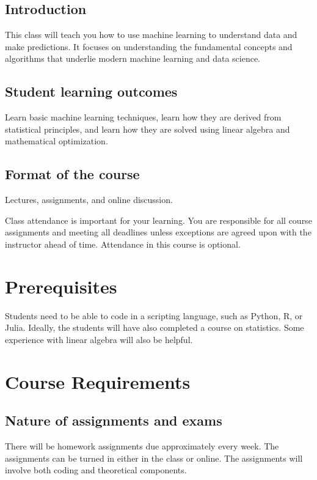 \documentclass[11pt]{article}
\begin{document}
\subsection{Introduction}
This class will teach you how to use machine learning to understand data and make predictions. It focuses on understanding the fundamental concepts and algorithms that underlie modern machine learning and data science.

\subsection{Student learning outcomes}
Learn basic machine learning techniques, learn how they are derived from statistical principles, and learn how they are solved using linear algebra and mathematical optimization.

\subsection{Format of the course}
Lectures, assignments, and online discussion.

Class attendance is important for your learning. You are responsible for all course
assignments and meeting all deadlines unless exceptions are agreed upon with the
instructor ahead of time. Attendance in this course is optional.

\section{Prerequisites}

Students need to be able to code in a scripting language, such as Python, R, or Julia.
Ideally, the students will have also completed a course on statistics.
Some experience with linear algebra will also be helpful.

\section{Course Requirements}

\subsection{Nature of assignments and exams}

There will be homework assignments due approximately every week.
The assignments can be turned in either in the class or online.
The assignments will involve both coding and theoretical components.
\end{document}
